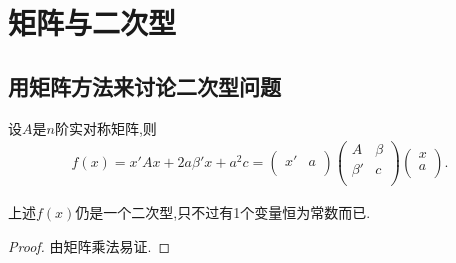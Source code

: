 \documentclass[../../main.tex]{subfiles}
\begin{document}
\section{矩阵与二次型}

\subsection{用矩阵方法来讨论二次型问题}

\begin{lemma}\label{lemma:一般二次型的矩阵形式}
设$A$是$n$阶实对称矩阵,则
\begin{align*}
f\left( x \right) =x' Ax+2a\beta ' x+a^2c=\left( \begin{matrix}
x'&		a\\
\end{matrix} \right) \left( \begin{matrix}
A&		\beta\\
\beta '&		c\\
\end{matrix} \right) \left( \begin{array}{c}
x\\
a\\
\end{array} \right) .
\end{align*}
\end{lemma}
\begin{remark}
上述$f(x)$仍是一个二次型,只不过有1个变量恒为常数而已.
\end{remark}
\begin{proof}
由矩阵乘法易证.
\end{proof}
\end{document}
